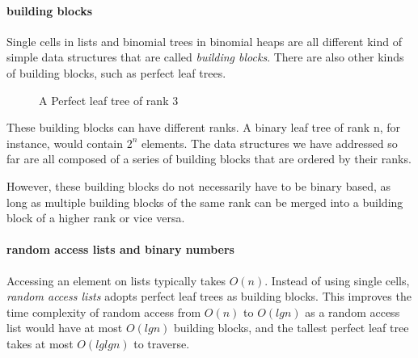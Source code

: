 \documentclass[\main/thesis.tex]{subfiles}
\begin{document}
\paragraph{building blocks}

Single cells in lists and binomial trees in binomial heaps are all different
kind of simple data structures that are called \textit{building blocks}.
There are also other kinds of building blocks, such as perfect leaf trees.

\begin{figure}[H]
    \centering
\caption{A Perfect leaf tree of rank 3}
\label{figure:4}
\end{figure}

These building blocks can have different ranks.
A binary leaf tree of rank n, for instance, would contain $ 2^n $ elements.
The data structures we have addressed so far are all composed of a series of
building blocks that are ordered by their ranks.

However, these building blocks do not necessarily have to be binary based,
as long as multiple building blocks of the same rank can be merged into a
building block of a higher rank or vice versa.


\paragraph{random access lists and binary numbers}

Accessing an element on lists typically takes $ O(n) $.
Instead of using single cells, \textit{random access lists} adopts perfect
leaf trees as building blocks.
This improves the time complexity of random access from $ O(n) $ to $ O(lg n) $
as a random access list would have at most $ O(lg n) $ building blocks, and
the tallest perfect leaf tree takes at most $ O(lglg n) $ to traverse.
\end{document}
